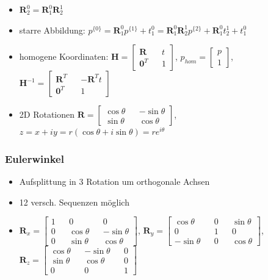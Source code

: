 \documentclass[11pt]{article}
\begin{document}
\begin{itemize}
    \item $\boldsymbol{R}_2^0 = \boldsymbol{R}_1^0 \boldsymbol{R}_2^1$
    \item starre Abbildung: $p^{\{0\}} = \boldsymbol{R}_1^0 p^{\{1\}} + t_1^0 = \boldsymbol{R}_1^0 \boldsymbol{R}_2^1 p^{\{2\}} + \boldsymbol{R}_1^0 t_2^1 + t_1^0 $
    \item homogene Koordinaten: $\boldsymbol{H} = \begin{bmatrix} \boldsymbol{R} && t \\ \boldsymbol{0}^T && 1 \end{bmatrix}$, $p_{hom} = \begin{bmatrix} p \\ 1 \end{bmatrix}$, $\boldsymbol{H}^{-1} = \begin{bmatrix} \boldsymbol{R}^T && - \boldsymbol{R}^T t \\ \boldsymbol{0}^T && 1 \end{bmatrix}$
    \item 2D Rotationen $\boldsymbol{R} = \begin{bmatrix} \cos{\theta} && -\sin{\theta} \\ \sin{\theta} && \cos{\theta} \end{bmatrix}$, $z = x + iy = r(\cos{\theta} + i \sin{\theta}) = r e^{i\theta}$
\end{itemize}


\subsubsection{Eulerwinkel}
\begin{itemize}
    \item Aufsplittung in 3 Rotation um orthogonale Achsen
    \item 12 versch. Sequenzen möglich
    \item $\boldsymbol{R}_x = \begin{bmatrix} 1 && 0 && 0 \\ 0 && \cos{\theta} && - \sin{\theta} \\ 0 && \sin{\theta} && \cos{\theta} \end{bmatrix}$, $\boldsymbol{R}_y = \begin{bmatrix} \cos{\theta} && 0 && \sin{\theta} \\ 0 && 1 && 0 \\ - \sin{\theta} && 0 && \cos{\theta} \end{bmatrix}$, $\boldsymbol{R}_z = \begin{bmatrix} \cos{\theta} && - \sin{\theta} && 0 \\ \sin{\theta} && \cos{\theta} && 0 \\ 0 && 0 && 1 \end{bmatrix}$
\end{itemize}
\end{document}
